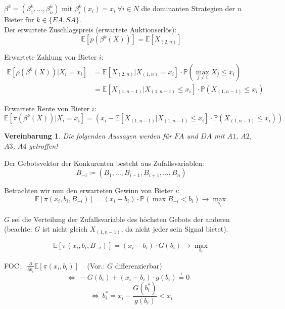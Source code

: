 \documentclass[12pt]{extreport} %
\theoremstyle{named}
\theoremstyle{itshape}
\theoremstyle{normal}
\newtheorem*{vereinbarung}{Vereinbarung}
\begin{document}
$\beta^{k} = \left(\beta_{1}^{k}, \dotsc, \beta_{n}^{k} \right)$ mit $\beta_{i}^{k}(x_{i}) = x_{i} ~\forall i \in N$ die dominanten Strategien der $n$ Bieter für $k \in \{ EA, SA \}$. \\

Der erwartete Zuschlagspreis (erwartete Auktionserlös):
	$$ \mathbb{E}\left[ p\left(\beta^{k}(X) \right) \right] = \mathbb{E}[X_{(2,n)}] $$
	
Erwartete Zahlung von Bieter $i$:
	\begin{align*}
		\mathbb{E}\left[ \rho\left( \beta^{k}(X) \right) \big| X_{i} = x_{i} \right] & = \mathbb{E}\left[ X_{(2,n)} \big| X_{(1, n)} = x_{i} \right] \cdot \mathbb{P}\left( \max_{j\neq i} X_{j} \leq x_{i} \right) \\
			& = \mathbb{E}\left[ X_{(1,n-1)} \big| X_{(1, n-1)} \leq x_{i} \right] \cdot \mathbb{P}\left( X_{(1, n-1)} \leq x_{i} \right)
	\end{align*}
	
Erwartete Rente von Bieter $i$:
$$ \mathbb{E}\left[ \pi\left( \beta^{k}(X) \right) \big| X_{i} = x_{i} \right] = \left( x_{i} - \mathbb{E} \left[ X_{(1, n-1)} \big| X_{(1, n-1)} \leq x_{i} \right] \cdot \mathbb{P}\left( X_{(1,n-1)} \leq x_{i} \right) \right) $$

\begin{vereinbarung}
	Die folgenden Aussagen werden für $FA$ und $DA$ mit $A1$, $A2$, $A3$, $A4$ getroffen!
\end{vereinbarung}

Der Gebotsvektor der Konkurenten besteht aus Zufallsvariablen:
	$$ B_{-i} \coloneqq \left(B_{1}, \dotsc, B_{i-1}, B_{i+1}, \dotsc, B_{n} \right) $$

Betrachten wir nun den erwarteten Gewinn von Bieter $i$:
$$ \mathbb{E}[\pi\left( x_{i}, b_{i}, B_{-i} \right)] = (x_{i} - b_{i}) \cdot \mathbb{P}\left( \max B_{-i} < b_{i} \right) \longrightarrow \max_{b_{i}} $$

$G$ sei die Verteilung der Zufallsvariable des höchsten Gebots der anderen (beachte: $G$ ist nicht gleich $X_{(1, n-1)}$, da nicht jeder sein Signal bietet).

$$ \mathbb{E}[\pi\left( x_{i}, b_{i}, B_{-i} \right)] = (x_{i} - b_{i}) \cdot G(b_{i}) \longrightarrow \max_{b_{i}} $$

FOC: ~$\frac{\partial}{\partial b_{i}} \mathbb{E}\left[ \pi(x_{i}, b_{i} ) \right]$ ~ (Vor.: $G$ differenzierbar)
$$ \iff ~ - G(b_{i}) + (x_{i} - b_{i}) \cdot g(b_{i}) \overset{!}{=} 0 \quad $$
$$ \iff ~ b_{i}^{*} = x_{i} - \frac{G(b_{i}^{*})}{g(b_{i})} < x_{i} $$
\end{document}
